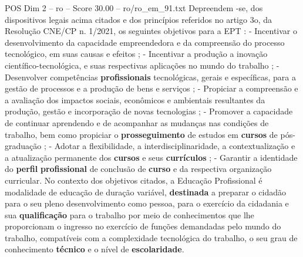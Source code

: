 \begin{textsample}{POS Dim 2 – ro – Score 30.00 – ro/ro\_em\_91.txt}
Depreendem -se, dos dispositivos legais acima citados e dos princípios referidos no artigo 3o, da Resolução CNE/CP n. 1/2021, os seguintes objetivos para a EPT : - Incentivar o desenvolvimento da capacidade empreendedora e da compreensão do processo tecnológico, em suas causas e efeitos ; - Incentivar a produção a inovação científico-tecnológica, e suas respectivas aplicações no mundo do trabalho ; - Desenvolver competências \textbf{profissionais} tecnológicas, gerais e específicas, para a gestão de processos e a produção de bens e serviços ; - Propiciar a compreensão e a avaliação dos impactos sociais, econômicos e ambientais resultantes da produção, gestão e incorporação de novas tecnologias ; - Promover a capacidade de continuar aprendendo e de acompanhar as mudanças nas condições de trabalho, bem como propiciar o \textbf{prosseguimento} de estudos em \textbf{cursos} de pós-graduação ; - Adotar a flexibilidade, a interdisciplinaridade, a contextualização e a atualização permanente dos \textbf{cursos} e seus \textbf{currículos} ; - Garantir a identidade do \textbf{perfil} \textbf{profissional} de conclusão de \textbf{curso} e da respectiva organização curricular.
No contexto dos objetivos citados, a Educação Profissional é modalidade de educação de duração variável, \textbf{destinada} a preparar o cidadão para o seu pleno desenvolvimento como pessoa, para o exercício da cidadania e sua \textbf{qualificação} para o trabalho por meio de conhecimentos que lhe proporcionam o ingresso no exercício de funções demandadas pelo mundo do trabalho, compatíveis com a complexidade tecnológica do trabalho, o seu grau de conhecimento \textbf{técnico} e o nível de \textbf{escolaridade}.

\end{textsample}
